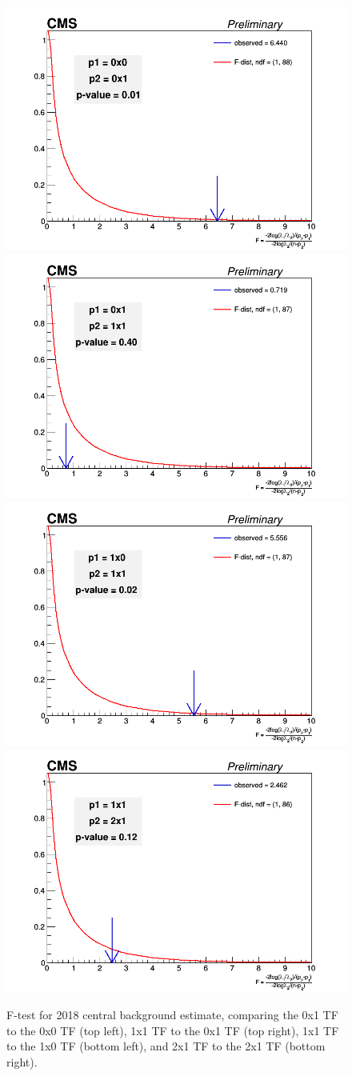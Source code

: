             \begin{figure}[!htbp]
                \begin{center}
                \includegraphics[width=0.4\linewidth]{Plots/tests/ftest_cen_0x0_vs_0x1_2018.png}
                \includegraphics[width=0.4\linewidth]{Plots/tests/ftest_cen_0x1_vs_1x1_2018.png}
                \includegraphics[width=0.4\linewidth]{Plots/tests/ftest_cen_1x0_vs_1x1_2018.png}
                \includegraphics[width=0.4\linewidth]{Plots/tests/ftest_cen_1x1_vs_2x1_2018.png}
    
                    \caption{F-test for 2018 central background estimate, comparing the 0x1 TF to the 0x0 TF (top left), 1x1 TF to the 0x1 TF (top right), 1x1 TF to the 1x0 TF (bottom left), and 2x1 TF to the 2x1 TF (bottom right).}
                    \label{fig:ftest18}
                \end{center}
            \end{figure}
            
